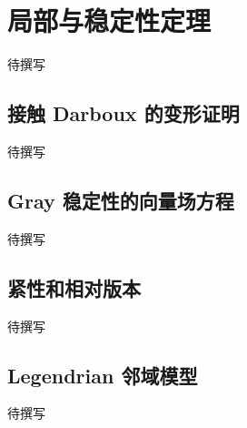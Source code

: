 
% 
% 

\section{局部与稳定性定理}
\label{g4:sec:1302}

待撰写

\subsection{接触 Darboux 的变形证明}
\label{g4:subsec:1302:01}
待撰写

\subsection{Gray 稳定性的向量场方程}
\label{g4:subsec:1302:02}
待撰写

\subsection{紧性和相对版本}
\label{g4:subsec:1302:03}
待撰写

\subsection{Legendrian 邻域模型}
\label{g4:subsec:1302:04}
待撰写
